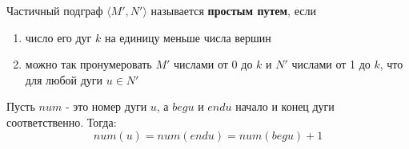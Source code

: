 \hspace{3mm}

Частичный подграф $\langle M', N'\rangle$ называется \textbf{простым путем}, если
\begin{enumerate}
    \item число его дуг $k$ на единицу меньше числа вершин
    \item можно так пронумеровать $M'$ числами от 0 до $k$ и $N'$ числами от 1 до $k$,
    что для любой дуги $u \in N'$
\end{enumerate}

Пусть $num$ - это номер дуги $u$, а $beg u$ и $end u$ начало и конец дуги соответственно. Тогда:
\begin{equation}
    num(u) = num(end u ) = num(beg u) + 1
\end{equation}
